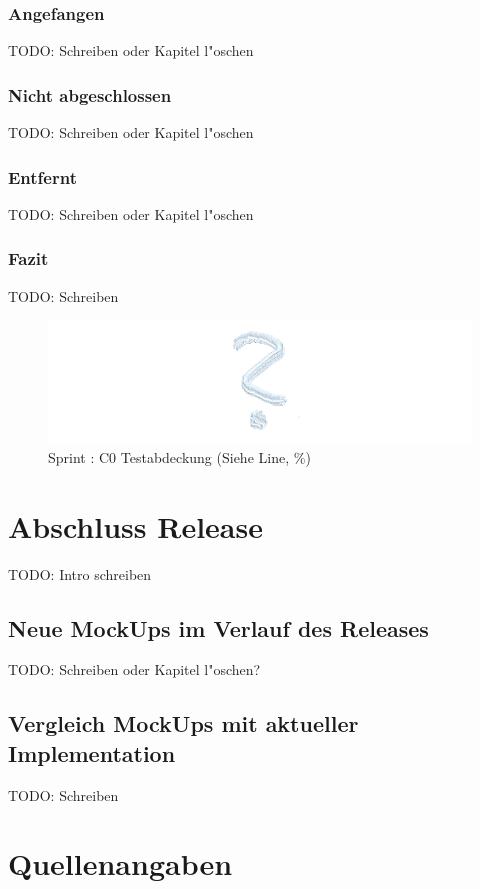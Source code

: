 \documentclass[12pt, titlepage]{scrartcl}
\newcommand{\RN}[1]{%
	\textup{\uppercase\expandafter{\romannumeral#1}}%
}
\begin{document}
	    	\subsubsection{Angefangen}
	    		TODO: Schreiben oder Kapitel l"oschen
	    	\subsubsection{Nicht abgeschlossen}
	    		TODO: Schreiben oder Kapitel l"oschen
	    	\subsubsection{Entfernt}
	    		TODO: Schreiben oder Kapitel l"oschen
	    	\subsubsection{Fazit}
	    		TODO: Schreiben
	    		\begin{figure}[H] 
	    			\centering
	    			\includegraphics[width=\textwidth]{images/sprintVI/coverage.png}
	    			\caption{Sprint \RN{6}: C0 Testabdeckung (Siehe Line, \%)}
	    			\label{Coverage_6}
	    		\end{figure} 
	\newpage
	\section{Abschluss Release \RN{3}}
		TODO: Intro schreiben
		\subsection{Neue MockUps im Verlauf des Releases \RN{3}}
		TODO: Schreiben oder Kapitel l"oschen?
		\subsection{Vergleich MockUps mit aktueller Implementation}
		TODO: Schreiben
	\newpage
	\section{Quellenangaben}
		\listoffigures
		\listoftables
\end{document}

